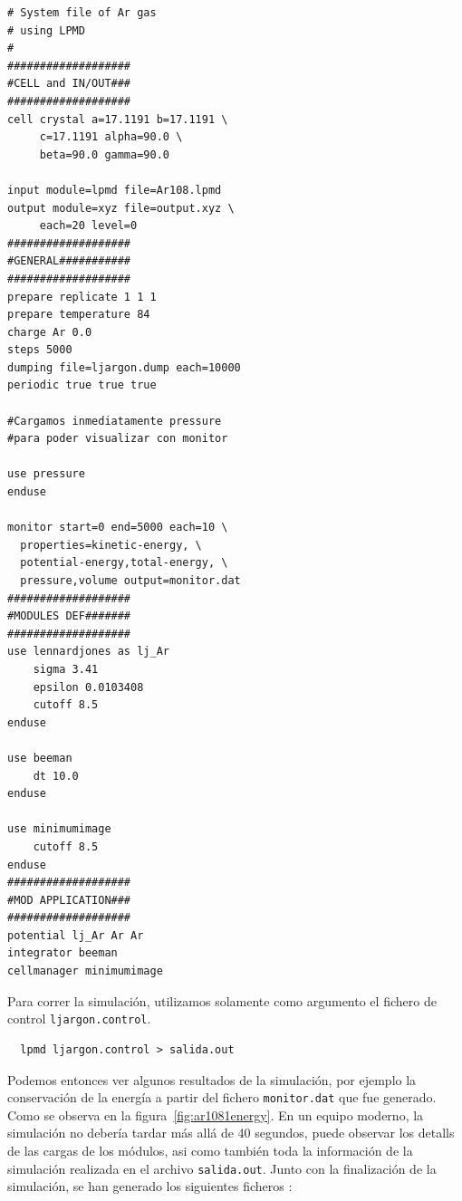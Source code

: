 \begin{multicols}{2}
\setlength{\columnseprule}{.5pt}
\begin{verbatim}
# System file of Ar gas 
# using LPMD
#
###################
#CELL and IN/OUT###
###################
cell crystal a=17.1191 b=17.1191 \
     c=17.1191 alpha=90.0 \
     beta=90.0 gamma=90.0

input module=lpmd file=Ar108.lpmd
output module=xyz file=output.xyz \
     each=20 level=0
###################
#GENERAL###########
###################
prepare replicate 1 1 1
prepare temperature 84
charge Ar 0.0
steps 5000
dumping file=ljargon.dump each=10000
periodic true true true

#Cargamos inmediatamente pressure
#para poder visualizar con monitor

use pressure
enduse

monitor start=0 end=5000 each=10 \
  properties=kinetic-energy, \
  potential-energy,total-energy, \
  pressure,volume output=monitor.dat
###################
#MODULES DEF#######
###################
use lennardjones as lj_Ar
    sigma 3.41
    epsilon 0.0103408
    cutoff 8.5
enduse

use beeman
    dt 10.0
enduse

use minimumimage
    cutoff 8.5
enduse
###################
#MOD APPLICATION###
###################
potential lj_Ar Ar Ar
integrator beeman
cellmanager minimumimage
\end{verbatim}
\end{multicols}


Para correr la simulaci\'on, utilizamos solamente como argumento el fichero de control \verb|ljargon.control|.
\begin{verbatim}
  lpmd ljargon.control > salida.out
\end{verbatim}


Podemos entonces ver algunos resultados de la simulaci\'on, por ejemplo la conservaci\'on de la energ\'ia a partir del fichero \verb|monitor.dat| que fue generado. Como se observa en la figura~\ref{fig:ar1081energy}. En un equipo moderno, la simulaci\'on no deber\'ia tardar m\'as all\'a de 40 segundos, puede observar los detalls de las cargas de los m\'odulos, asi como tambi\'en toda la informaci\'on de la simulaci\'on realizada en el archivo \verb|salida.out|. Junto con la finalizaci\'on de la simulaci\'on, se han generado los siguientes ficheros :

